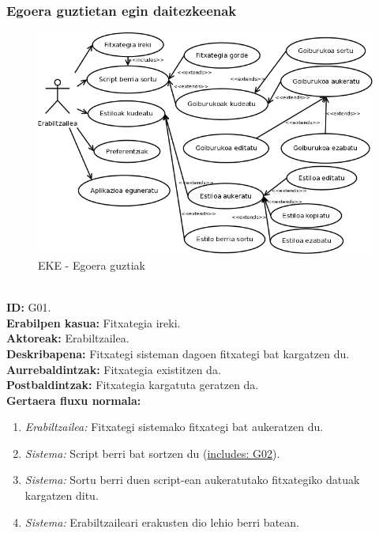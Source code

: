 \subsubsection{Egoera guztietan egin daitezkeenak}
\begin{figure}[htp]
\begin{center}
\includegraphics[scale=0.4]{Pictures/Chapter4/Analisia/EKE-Guztiak.png}
\caption{EKE - Egoera guztiak}
\label{eke-guztiak}
\end{center}
\end{figure}
\noindent\\
\textbf{ID:} G01.\\
\textbf{Erabilpen kasua:} Fitxategia ireki.\\
\textbf{Aktoreak:} Erabiltzailea.\\
\textbf{Deskribapena:} Fitxategi sisteman dagoen fitxategi bat kargatzen du.\\
\textbf{Aurrebaldintzak:} Fitxategia existitzen da.\\
\textbf{Postbaldintzak:} Fitxategia kargatuta geratzen da.\\
\textbf{Gertaera fluxu normala:}
\begin{enumerate}
	\item \textit{Erabiltzailea:} Fitxategi sistemako fitxategi bat aukeratzen du.
	\item \textit{Sistema:} Script berri bat sortzen du (\underline{includes: G02}).
	\item \textit{Sistema:} Sortu berri duen script-ean aukeratutako fitxategiko datuak kargatzen ditu.
	\item \textit{Sistema:} Erabiltzaileari erakusten dio lehio berri batean.
\end{enumerate}
